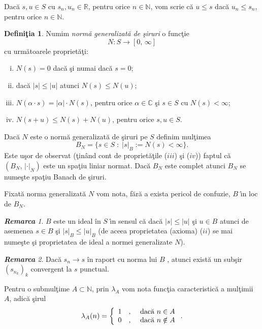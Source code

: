 \documentclass[ a4paper, 12pt]{report}
\theoremstyle{definition}
\newtheorem{definition}{\bf Defini\c tia}[section]
\theoremstyle{remark}
\newtheorem{remarc}{\bf Remarca}[section]
\numberwithin{equation}{section}
\begin{document}
Dac\u a $s, u \in S$ cu $s_n, u_n \in \mathbb{R}$, pentru orice $n \in \mathbb{N}$, vom scrie c\u a $u \leq s$ dac\u a $u_n \leq s_n$, pentru orice $n \in \mathbb{N}$.

\begin{definition}
Numim {\it norm\u a generalizat\u a de \c siruri} o func\c tie
$$N:S \rightarrow [0,\, \infty]$$ cu urm\u atoarele propriet\u a\c ti:
\begin{enumerate}[(i)]
\item $N(s)=0$ dac\u a \c si numai dac\u a $s=0$;
\item dac\u a $\lvert s \rvert \leq \lvert u \rvert$ atunci $N(s) \leq N(u)$;
\item $N(\alpha \cdot s)=\lvert \alpha \rvert \cdot N(s)$, pentru orice $\alpha \in \mathbb{C}$ \c si $s \in S$ cu $N(s)<\infty$;
\item $N(s+u) \leq N(s)+N(u)$, pentru orice  $s,u \in S$.
\end{enumerate}
\end{definition}
Dac\u a $N$ este o norm\u a generalizat\u a de \c siruri pe $S$ definim mul\c timea
$$B_N = \{s \in S\; : \; {\lvert s \rvert}_B := N(s) <\infty \}.$$
Este u\c sor de observat (\c tin\^ and cont de propriet\u a\c tile ($iii$) \c si ($iv$)) faptul c\u a $(B_N,\, {\lvert \cdot \rvert}_N)$ este un spa\c tiu liniar normat.
Dac\u a $B_N$ este complet atunci $B_N$ se nume\c ste spa\c tiu Banach de \c siruri.

Fixat\u a norma generalizat\u a $N$ vom nota, f\u ar\u a a exista pericol de confuzie, $B$ \^\i n loc de $B_N$.

\begin{remarc}
$B$ este un ideal \^in $S$ \^\i n sensul c\u a dac\u a $\lvert s \rvert \leq \lvert u \rvert$ \c si $u \in B$ atunci de asemenea $s \in B$ \c si ${\lvert s \rvert}_B \leq {\lvert u \rvert}_B$ (de aceea proprietatea (axioma) ($ii$) se mai nume\c ste \c si proprietatea de ideal a normei generalizate $N$).
\end{remarc}
\begin{remarc}
Dac\u a $s_n \longrightarrow s$ \^in raport cu norma lui $B$ , atunci exist\u a un sub\c sir $(s_{n_k})_k$ convergent la $s$ punctual.
\end{remarc}

\medskip

Pentru o submul\c time $A \subset \mathbb{N}$, prin $\lambda_A$ vom nota func\c tia caracteristic\u a a mul\c timii $A$, adic\u a \c sirul
$$\lambda_A(n) = \left\{ \begin{array}{lcl} 1&,& \hbox{ dac\u a } n \in A \\ 0&,& \hbox{ dac\u a } n \notin A \end{array}\right. .$$
\end{document}
